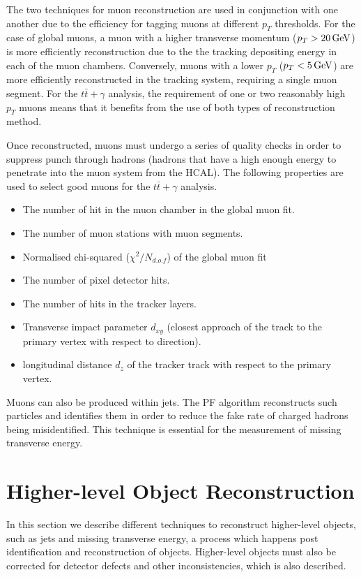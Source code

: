 The two techniques for muon reconstruction are used in conjunction with one another due to the efficiency for tagging muons at different $p_T$ thresholds. For the case of global muons, a muon with a higher transverse momentum ($p_T > 20 \,\text{Ge\hspace{-.08em}V}$) is more efficiently reconstruction due to the the tracking depositing energy in each of the muon chambers. Conversely, muons with a lower $p_T$ ($p_T < 5 \,\text{Ge\hspace{-.08em}V}$) are more efficiently reconstructed in the tracking system, requiring a single muon segment. For the $t\bar{t}+\gamma$ analysis, the requirement of one or two reasonably high $p_T$ muons means that it benefits from the use of both types of reconstruction method.

Once reconstructed, muons must undergo a series of quality checks in order to suppress punch through hadrons (hadrons that have a high enough energy to penetrate into the muon system from the HCAL). The following properties are used to select good muons for the $t\bar{t}+\gamma$ analysis.

\begin{itemize}
	\item The number of hit in the muon chamber in the global muon fit.
	\item The number of muon stations with muon segments.
	\item Normalised chi-squared ($\chi^2/N_{d.o.f}$) of the global muon fit
	\item The number of pixel detector hits.
	\item The number of hits in the tracker layers.
	\item Transverse impact parameter $d_{xy}$ (closest approach of the track to the primary vertex with respect to direction).
	\item longitudinal distance $d_z$ of the tracker track with respect to the primary vertex.
\end{itemize}

Muons can also be produced within jets. The PF algorithm reconstructs such particles and identifies them in order to reduce the fake rate of charged hadrons being misidentified. This technique is essential for the measurement of missing transverse energy. 

\section{Higher-level Object Reconstruction} \label{sec-HigherLevelObjects}

In this section we describe different techniques to reconstruct higher-level objects, such as jets and missing transverse energy, a process which happens post identification and reconstruction of objects. Higher-level objects must also be corrected for detector defects and other inconsistencies, which is also described.

